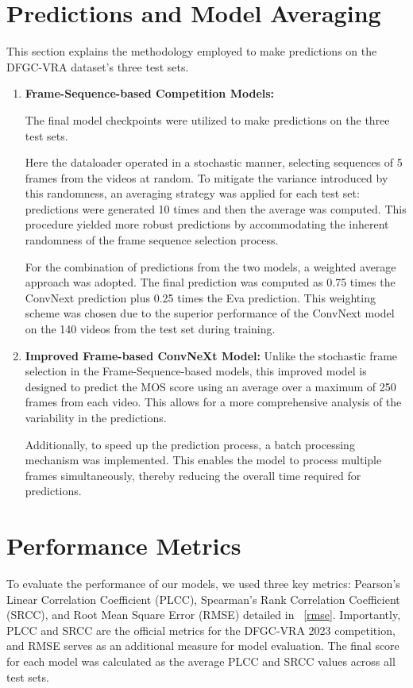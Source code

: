 \documentclass[a4paper,12pt,openright]{book}
\begin{document}
\section{Predictions and Model Averaging}
This section explains the methodology employed to make predictions on the DFGC-VRA dataset's three test sets.


\begin{enumerate}
    \item \textbf{Frame-Sequence-based Competition Models:} 

The final model checkpoints were utilized to make predictions on the three test sets.

Here the dataloader operated in a stochastic manner, selecting sequences of 5 frames from the videos at random. To mitigate the variance introduced by this randomness, an averaging strategy was applied for each test set: predictions were generated 10 times and then the average was computed. This procedure yielded more robust predictions by accommodating the inherent randomness of the frame sequence selection process.

For the combination of predictions from the two models, a weighted average approach was adopted. The final prediction was computed as 0.75 times the ConvNext prediction plus 0.25 times the Eva prediction. This weighting scheme was chosen due to the superior performance of the ConvNext model on the 140 videos from the test set during training. 

\item \textbf{Improved Frame-based ConvNeXt Model:}
Unlike the stochastic frame selection in the Frame-Sequence-based models, this improved model is designed to predict the MOS score using an average over a maximum of 250 frames from each video. This allows for a more comprehensive analysis of the variability in the predictions. 

Additionally, to speed up the prediction process, a batch processing mechanism was implemented. This enables the model to process multiple frames simultaneously, thereby reducing the overall time required for predictions. 
\end{enumerate}

\section{Performance Metrics}
To evaluate the performance of our models, we used three key metrics: Pearson's Linear Correlation Coefficient (PLCC), Spearman's Rank Correlation Coefficient (SRCC), and Root Mean Square Error (RMSE) detailed in ~\ref{rmse}. Importantly, PLCC and SRCC are the official metrics for the DFGC-VRA 2023 competition, and RMSE serves as an additional measure for model evaluation.
The final score for each model was calculated as the average PLCC and SRCC values across all test sets.
\end{document}
